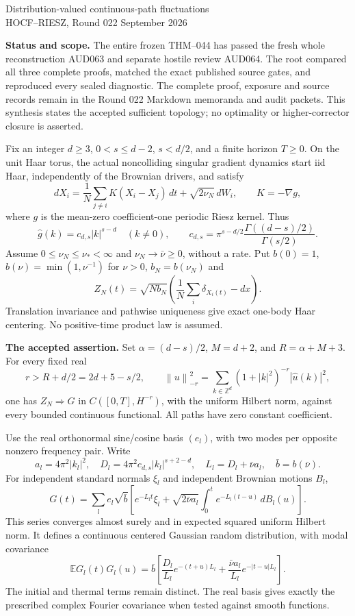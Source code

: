 \documentclass[11pt]{article}
\newcommand{\E}{\mathbb E}
\newcommand{\norm}[1]{\left\|#1\right\|}
\begin{document}
\begin{center}
{\large Distribution-valued continuous-path fluctuations}\\[4pt]
HOCF--RIESZ, Round 022  September 2026
\end{center}
\noindent\textbf{Status and scope.}
The entire frozen THM--044 has passed the fresh whole reconstruction AUD063 and separate hostile review AUD064. The root compared all three complete proofs, matched the exact published source gates, and reproduced every sealed diagnostic. The complete proof, exposure and source records remain in the Round 022 Markdown memoranda and audit packets. This synthesis states the accepted sufficient topology; no optimality or higher-corrector closure is asserted.

Fix an integer $d\ge3$, $0<s\le d-2$, $s<d/2$, and a finite horizon $T\ge0$. On the unit Haar torus, the actual noncolliding singular gradient dynamics start iid Haar, independently of the Brownian drivers, and satisfy
\[
 dX_i=\frac1N\sum_{j\ne i}K(X_i-X_j)\,dt+\sqrt{2\nu_N}\,dW_i,
 \qquad K=-\nabla g,
\]
where $g$ is the mean-zero coefficient-one periodic Riesz kernel. Thus
\[
 \widehat g(k)=c_{d,s}|k|^{s-d}\quad(k\ne0),\qquad
 c_{d,s}=\pi^{s-d/2}\frac{\Gamma((d-s)/2)}{\Gamma(s/2)}.
\]
Assume $0\le\nu_N\le\nu_*<\infty$ and $\nu_N\to\bar\nu\ge0$, without a rate. Put $b(0)=1$, $b(\nu)=\min(1,\nu^{-1})$ for $\nu>0$, $b_N=b(\nu_N)$ and
\[
 Z_N(t)=\sqrt{Nb_N}\left(\frac1N\sum_i\delta_{X_i(t)}-dx\right).
\]
Translation invariance and pathwise uniqueness give exact one-body Haar centering. No positive-time product law is assumed.

\noindent\textbf{The accepted assertion.}
Set $\alpha=(d-s)/2$, $M=d+2$, and $R=\alpha+M+3$. For every fixed real
\[
 r>R+d/2=2d+5-s/2,
 \qquad \norm{u}_{-r}^2=\sum_{k\in\mathbb Z^d}(1+|k|^2)^{-r}|\widehat u(k)|^2,
\]
one has $Z_N\Longrightarrow G$ in $C([0,T],H^{-r})$, with the uniform Hilbert norm, against every bounded continuous functional. All paths have zero constant coefficient.

Use the real orthonormal sine/cosine basis $(e_l)$, with two modes per opposite nonzero frequency pair. Write
\[
 a_l=4\pi^2|k_l|^2,\quad D_l=4\pi^2c_{d,s}|k_l|^{s+2-d},
 \quad L_l=D_l+\bar\nu a_l,\quad\bar b=b(\bar\nu).
\]
For independent standard normals $\xi_l$ and independent Brownian motions $B_l$,
\[
 G(t)=\sum_l e_l\sqrt{\bar b}\left[e^{-L_lt}\xi_l+
 \sqrt{2\bar\nu a_l}\int_0^t e^{-L_l(t-u)}\,dB_l(u)\right].
\]
This series converges almost surely and in expected squared uniform Hilbert norm. It defines a continuous centered Gaussian random distribution, with modal covariance
\[
 \E G_l(t)G_l(u)=\bar b\left[
 \frac{D_l}{L_l}e^{-(t+u)L_l}
 +\frac{\bar\nu a_l}{L_l}e^{-|t-u|L_l}\right].
\]
The initial and thermal terms remain distinct. The real basis gives exactly the prescribed complex Fourier covariance when tested against smooth functions.
\end{document}
